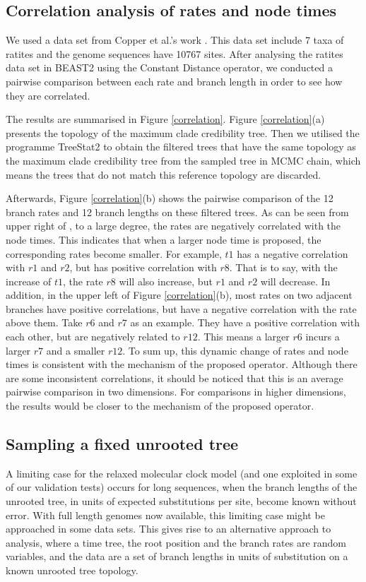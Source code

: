 \documentclass{bmcart}
\begin{document}
\subsection*{Correlation analysis of rates and node times}
 We used a data set from Copper et al.'s work \cite{cooper2001complete}. This data set include 7 taxa of ratites and the genome sequences have 10767 sites. After analysing the ratites data set in BEAST2 using the Constant Distance operator, we conducted a pairwise comparison between each rate and branch length in order to see how they are correlated.

The results are summarised in Figure \ref{correlation}. Figure \ref{correlation}(a) presents the topology of the maximum clade credibility tree. Then we utilised the programme TreeStat2 \cite{TreeStat2} to obtain the filtered trees that have the same topology as the maximum clade credibility tree from the sampled tree in MCMC chain, which means the trees that do not match this reference topology are discarded. 

Afterwards, Figure \ref{correlation}(b) shows the pairwise comparison of the 12 branch rates and 12 branch lengths on these filtered trees. As can be seen from upper right of , to a large degree, the rates are negatively correlated with the node times. This indicates that when a larger node time is proposed, the corresponding rates become smaller. For example, $t1$ has a negative correlation with $r1$ and $r2$, but has positive correlation with $r8$. That is to say, with the increase of $t1$, the rate $r8$ will also increase, but $r1$ and $r2$ will decrease. In addition, in the upper left of Figure \ref{correlation}(b), most rates on two adjacent branches have positive correlations, but have a negative correlation with the rate above them. Take $r6$ and $r7$ as an example. They have a positive correlation with each other, but are negatively related to $r12$. This means a larger $r6$ incurs a larger $r7$ and a smaller $r12$. To sum up, this dynamic change of rates and node times is consistent with the mechanism of the proposed operator. Although there are some inconsistent correlations, it should be noticed that this is an average pairwise comparison in two dimensions. For comparisons in higher dimensions, the results would be closer to the mechanism of the proposed operator.

\subsection*{Sampling a fixed unrooted tree}
A limiting case for the relaxed molecular clock model (and one exploited in some of our validation tests) occurs for long sequences, when the branch lengths of the unrooted tree, in units of expected substitutions per site, become known without error.  With full length genomes now available, this limiting case might be approached in some data sets. This gives rise to an alternative approach to analysis, where a time tree, the root position and the branch rates are random variables, and the data are a set of branch lengths in units of substitution on a known unrooted tree topology.
\end{document}
